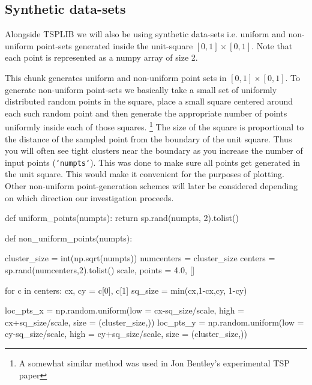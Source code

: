\subsection{Synthetic data-sets}
Alongside TSPLIB we will also be using synthetic data-sets i.e. uniform and non-uniform point-sets generated inside the unit-square $[0,1] \times [0,1]$. 
Note that each point is represented as a numpy array of size 2. 

This chunk generates uniform and non-uniform point sets in $[0,1] \times [0,1]$. To generate non-uniform point-sets we basically 
take a small set of uniformly distributed random points in the square, place a small square centered around each such random point and then
generate the appropriate number of points uniformly inside each of those squares. \footnote{A somewhat similar method was used in Jon Bentley's experimental TSP paper}
The size of the square is proportional to the distance of the sampled point from the boundary of the unit square. Thus you will often see tight clusters
near the boundary as you increase the number of input points (\texttt{`numpts`}). This was done to make sure all points get generated in the unit square. 
This would make it convenient for the purposes of plotting. Other non-uniform point-generation schemes will later be considered depending on which 
direction our investigation proceeds. 


\nwenddocs{}\endmoddef\nwstartdeflinemarkup{}\nwenddeflinemarkup
def uniform_points(numpts):
     return  sp.rand(numpts, 2).tolist()

def non_uniform_points(numpts):

    cluster_size = int(np.sqrt(numpts)) 
    numcenters   = cluster_size
    centers      = sp.rand(numcenters,2).tolist()
    scale, points = 4.0, []

    for c in centers:
        cx, cy = c[0], c[1]
        sq_size      = min(cx,1-cx,cy, 1-cy)

        loc_pts_x    = np.random.uniform(low  = cx-sq_size/scale, 
                                         high = cx+sq_size/scale, 
                                         size = (cluster_size,))
        loc_pts_y    = np.random.uniform(low = cy-sq_size/scale, 
                                         high = cy+sq_size/scale, 
                                         size = (cluster_size,))

